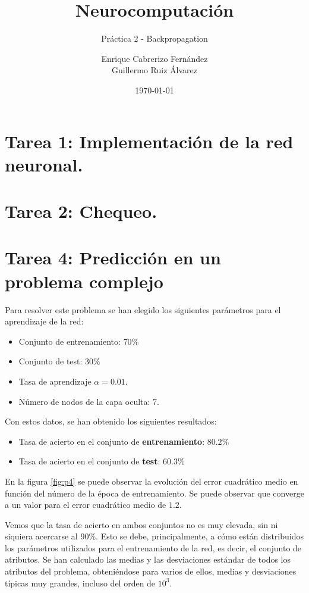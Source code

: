 \documentclass[spanish]{assignment}
\title{Neurocomputación}
\subtitle{Práctica 2 - Backpropagation}
\author{Enrique Cabrerizo Fernández\\ Guillermo Ruiz Álvarez}
\date{\today}
\begin{document}
	\makepre
	\section{Tarea 1: Implementación de la red neuronal.}
	
	\section{Tarea 2: Chequeo.}
	
	\section{Tarea 4: Predicción en un problema complejo}
	Para resolver este problema se han elegido los siguientes parámetros para el aprendizaje de la red:
	\begin{itemize}
		\item Conjunto de entrenamiento: $70\%$
		\item Conjunto de test: $30\%$
		\item Tasa de aprendizaje $\alpha = 0.01$.		
		\item Número de nodos de la capa oculta: $7$.
	\end{itemize}
	
	Con estos datos, se han obtenido los siguientes resultados:
	\begin{itemize}
		\item Tasa de acierto en el conjunto de \textbf{entrenamiento}: $80.2\%$
		\item Tasa de acierto en el conjunto de \textbf{test}: $60.3\%$
	\end{itemize}
	
	En la figura \ref{fig:p4} se puede observar la evolución del error cuadrático medio en función del número de la época de entrenamiento. Se puede observar que converge a un valor para el error cuadrático medio de $1.2$.
	
	
	Vemos que la tasa de acierto en ambos conjuntos no es muy elevada, sin ni siquiera acercarse al
	$90\%$. Esto se debe, principalmente, a cómo están distribuidos los parámetros utilizados para el entrenamiento de la red, es decir, el conjunto de atributos. Se han calculado las medias y las desviaciones estándar de todos los atributos del problema, obteniéndose para varios de ellos, medias y desviaciones típicas muy grandes, incluso del orden de $10^3$.
	
\end{document}
